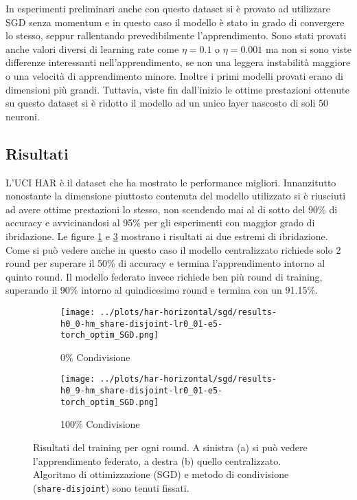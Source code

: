 In esperimenti preliminari anche con questo dataset si è provato ad 
utilizzare SGD senza momentum e in questo caso il modello è stato in 
grado di convergere lo stesso, seppur rallentando prevedibilmente 
l'apprendimento. Sono stati provati anche valori diversi di learning 
rate come \(\eta = 0.1\) o \(\eta = 0.001\) ma non si sono viste 
differenze interessanti nell'apprendimento, se non una leggera 
instabilità maggiore o una velocità di apprendimento minore.
Inoltre i primi modelli provati erano di dimensioni più grandi. 
Tuttavia, viste fin dall'inizio le ottime prestazioni ottenute su 
questo dataset si è ridotto il modello ad un unico layer nascosto di 
soli 50 neuroni.


\subsection{Risultati}
L'UCI HAR è il dataset che ha mostrato le performance migliori.
Innanzitutto nonostante la dimensione piuttosto contenuta del modello
utilizzato si è riusciuti ad avere ottime prestazioni lo stesso, non 
scendendo mai al di sotto del 90\% di accuracy e avvicinandosi al 
95\% per gli esperimenti con maggior grado di ibridazione. Le 
figure \ref{fig:hars0sgd} e \ref{fig:hars9sgd} mostrano i risultati 
ai due estremi di ibridazione.
Come si può vedere anche in questo caso il modello centralizzato 
richiede solo 2 round per superare il 50\% di accuracy e termina 
l'apprendimento intorno al quinto round. Il modello federato invece
richiede ben più round di training, superando il 90\% intorno al 
quindicesimo round e termina con un 91.15\%.

\begin{figure}[htp]  %
    \centering
    \begin{subfigure}[b]{0.49\textwidth}
        \centering
        \texttt{[image: ../plots/har-horizontal/sgd/results-h0\_0-hm\_share-disjoint-lr0\_01-e5-torch\_optim\_SGD.png]}
        \caption{0\% Condivisione}
        \label{fig:hars0sgd}
    \end{subfigure}
    \hfill
    \begin{subfigure}[b]{0.49\textwidth}
        \centering
        \texttt{[image: ../plots/har-horizontal/sgd/results-h0\_9-hm\_share-disjoint-lr0\_01-e5-torch\_optim\_SGD.png]}
        \caption{100\% Condivisione}
        \label{fig:hars9sgd}
    \end{subfigure}
    
    \caption{
        Risultati del training per ogni round. A sinistra (a) si può 
        vedere l'apprendimento federato, a destra (b) quello centralizzato.
        Algoritmo di ottimizzazione (SGD) e metodo di condivisione 
        (\texttt{share-disjoint}) sono tenuti fissati.
    }
\end{figure}


